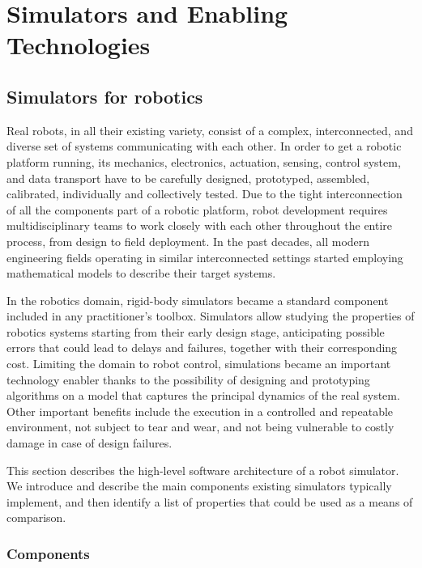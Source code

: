 \acresetall
\chapter{Simulators and Enabling Technologies}
\label{ch:introduction}

\section{Simulators for robotics}

Real robots, in all their existing variety, consist of a complex, interconnected, and diverse set of systems communicating with each other.
In order to get a robotic platform running, its mechanics, electronics, actuation, sensing, control system, and data transport have to be carefully designed, prototyped, assembled, calibrated, individually and collectively tested.
Due to the tight interconnection of all the components part of a robotic platform, robot development requires multidisciplinary teams to work closely with each other throughout the entire process, from design to field deployment.
In the past decades, all modern engineering fields operating in similar interconnected settings started employing mathematical models to describe their target systems.

In the robotics domain, rigid-body simulators became a standard component included in any practitioner's toolbox.
Simulators allow studying the properties of robotics systems starting from their early design stage, anticipating possible errors that could lead to delays and failures, together with their corresponding cost.
Limiting the domain to robot control, simulations became an important technology enabler thanks to the possibility of designing and prototyping algorithms on a model that captures the principal dynamics of the real system.
Other important benefits include the execution in a controlled and repeatable environment, not subject to tear and wear, and not being vulnerable to costly damage in case of design failures.

This section describes the high-level software architecture of a robot simulator.
We introduce and describe the main components existing simulators typically implement, and then identify a list of properties that could be used as a means of comparison.

\subsection{Components}

